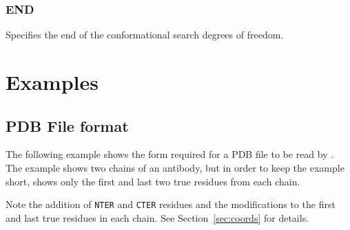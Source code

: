 \subsubsection{END}
\es
Specifies the end of the conformational search degrees of freedom.

\section{Examples}
\subsection{PDB File format}
\label{ex:coords}
The following example shows the form required for a PDB file to be
read by \cs. The example shows two chains of an antibody, but in order
to keep the example short, shows only the first and last two true
residues from each chain.

Note the addition of {\tt NTER} and {\tt CTER} residues and the modifications
to the first and last true residues in each chain. See 
Section~\ref{sec:coords} for details.

